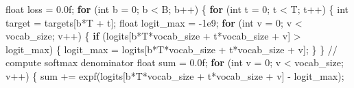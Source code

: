 \documentclass[
  letterpaper,
  DIV=11,
  numbers=noendperiod]{scrreprt}
\newenvironment{Shaded}{\begin{snugshade}}{\end{snugshade}}
\newcommand{\BuiltInTok}[1]{\textcolor[rgb]{0.00,0.23,0.31}{#1}}
\newcommand{\CommentTok}[1]{\textcolor[rgb]{0.37,0.37,0.37}{#1}}
\newcommand{\ControlFlowTok}[1]{\textcolor[rgb]{0.00,0.23,0.31}{\textbf{#1}}}
\newcommand{\DataTypeTok}[1]{\textcolor[rgb]{0.68,0.00,0.00}{#1}}
\newcommand{\DecValTok}[1]{\textcolor[rgb]{0.68,0.00,0.00}{#1}}
\newcommand{\FloatTok}[1]{\textcolor[rgb]{0.68,0.00,0.00}{#1}}
\newcommand{\NormalTok}[1]{\textcolor[rgb]{0.00,0.23,0.31}{#1}}
\newcommand{\OperatorTok}[1]{\textcolor[rgb]{0.37,0.37,0.37}{#1}}
\begin{document}
\begin{Shaded}
\begin{Highlighting}[]
\DataTypeTok{float}\NormalTok{ loss }\OperatorTok{=} \FloatTok{0.0}\BuiltInTok{f}\OperatorTok{;}
\ControlFlowTok{for} \OperatorTok{(}\DataTypeTok{int}\NormalTok{ b }\OperatorTok{=} \DecValTok{0}\OperatorTok{;}\NormalTok{ b }\OperatorTok{\textless{}}\NormalTok{ B}\OperatorTok{;}\NormalTok{ b}\OperatorTok{++)} \OperatorTok{\{}
    \ControlFlowTok{for} \OperatorTok{(}\DataTypeTok{int}\NormalTok{ t }\OperatorTok{=} \DecValTok{0}\OperatorTok{;}\NormalTok{ t }\OperatorTok{\textless{}}\NormalTok{ T}\OperatorTok{;}\NormalTok{ t}\OperatorTok{++)} \OperatorTok{\{}
        \DataTypeTok{int}\NormalTok{ target }\OperatorTok{=}\NormalTok{ targets}\OperatorTok{[}\NormalTok{b}\OperatorTok{*}\NormalTok{T }\OperatorTok{+}\NormalTok{ t}\OperatorTok{];}
        \DataTypeTok{float}\NormalTok{ logit\_max }\OperatorTok{=} \OperatorTok{{-}}\FloatTok{1e9}\OperatorTok{;}
        \ControlFlowTok{for} \OperatorTok{(}\DataTypeTok{int}\NormalTok{ v }\OperatorTok{=} \DecValTok{0}\OperatorTok{;}\NormalTok{ v }\OperatorTok{\textless{}}\NormalTok{ vocab\_size}\OperatorTok{;}\NormalTok{ v}\OperatorTok{++)} \OperatorTok{\{}
            \ControlFlowTok{if} \OperatorTok{(}\NormalTok{logits}\OperatorTok{[}\NormalTok{b}\OperatorTok{*}\NormalTok{T}\OperatorTok{*}\NormalTok{vocab\_size }\OperatorTok{+}\NormalTok{ t}\OperatorTok{*}\NormalTok{vocab\_size }\OperatorTok{+}\NormalTok{ v}\OperatorTok{]} \OperatorTok{\textgreater{}}\NormalTok{ logit\_max}\OperatorTok{)} \OperatorTok{\{}
\NormalTok{                logit\_max }\OperatorTok{=}\NormalTok{ logits}\OperatorTok{[}\NormalTok{b}\OperatorTok{*}\NormalTok{T}\OperatorTok{*}\NormalTok{vocab\_size }\OperatorTok{+}\NormalTok{ t}\OperatorTok{*}\NormalTok{vocab\_size }\OperatorTok{+}\NormalTok{ v}\OperatorTok{];}
            \OperatorTok{\}}
        \OperatorTok{\}}
        \CommentTok{// compute softmax denominator}
        \DataTypeTok{float}\NormalTok{ sum }\OperatorTok{=} \FloatTok{0.0}\BuiltInTok{f}\OperatorTok{;}
        \ControlFlowTok{for} \OperatorTok{(}\DataTypeTok{int}\NormalTok{ v }\OperatorTok{=} \DecValTok{0}\OperatorTok{;}\NormalTok{ v }\OperatorTok{\textless{}}\NormalTok{ vocab\_size}\OperatorTok{;}\NormalTok{ v}\OperatorTok{++)} \OperatorTok{\{}
\NormalTok{            sum }\OperatorTok{+=}\NormalTok{ expf}\OperatorTok{(}\NormalTok{logits}\OperatorTok{[}\NormalTok{b}\OperatorTok{*}\NormalTok{T}\OperatorTok{*}\NormalTok{vocab\_size }\OperatorTok{+}\NormalTok{ t}\OperatorTok{*}\NormalTok{vocab\_size }\OperatorTok{+}\NormalTok{ v}\OperatorTok{]} \OperatorTok{{-}}\NormalTok{ logit\_max}\OperatorTok{);}

\end{Highlighting}
\end{Shaded}
\end{document}
